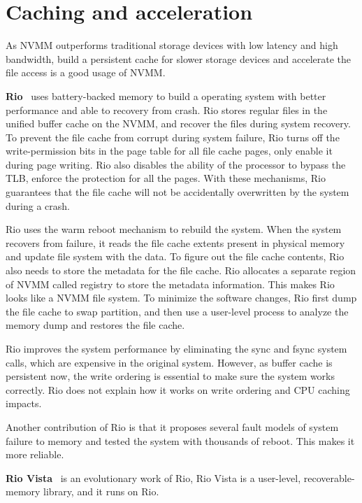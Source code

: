 \section{Caching and acceleration} 
\label{sec:caching}

As NVMM outperforms traditional storage devices with low latency and high
bandwidth, build a persistent cache for slower storage devices and
accelerate the file access is a good usage of NVMM. 

\textbf{Rio}~\cite{riofilecache} uses battery-backed memory to build a
operating system
with better performance and able to recovery from crash. Rio stores regular
files in the unified buffer cache on the NVMM, and recover the files
during system recovery.
To prevent the file
cache from corrupt during system failure, Rio turns off the write-permission
bits in the page table for all file cache pages, only enable it during page
writing. Rio also disables the ability of the processor to bypass the TLB,
enforce the protection for all the pages. With these mechanisms, Rio guarantees
that the file cache will not be accidentally overwritten by the system during
a crash.

Rio uses the warm reboot mechanism to rebuild the system. When the system 
recovers from failure, it reads the file cache extents present in physical
memory
and update file system with the data. To figure out the file cache contents,
Rio also needs to store the metadata for the file cache. Rio allocates a
separate region of NVMM called registry to store the metadata information.
This makes Rio looks like a NVMM file system.
To minimize the software changes, Rio first dump the file cache to swap
partition, and then use a user-level process to analyze the memory dump
and restores the file cache.

Rio improves the system performance by eliminating the sync and fsync system
calls, which are expensive in the original system. However, as buffer cache
is persistent now, the write ordering is essential to make sure the system
works correctly. Rio does not explain how it works on write ordering and CPU
caching impacts.

Another contribution of Rio is that it proposes several fault models of system
failure to memory and tested the system with thousands of reboot. This makes
it more reliable.
 
\textbf{Rio Vista}~\cite{riovista} is an evolutionary work of Rio,
Rio Vista is a
user-level, recoverable-memory library, and it runs on Rio.

